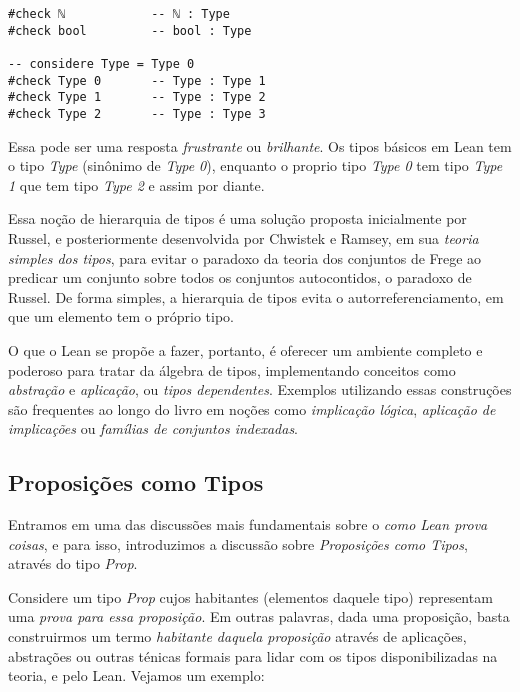 \vspace{5mm}
\begin{lstlisting}
#check ℕ            -- ℕ : Type
#check bool         -- bool : Type

-- considere Type = Type 0
#check Type 0       -- Type : Type 1
#check Type 1       -- Type : Type 2
#check Type 2       -- Type : Type 3
\end{lstlisting}
\vspace{5mm}

\noindent Essa pode ser uma resposta \textit{frustrante} ou \textit{brilhante}.
Os tipos básicos em Lean tem o tipo \textit{Type} (sinônimo de \textit{Type 0}), enquanto o proprio tipo \textit{Type 0} tem tipo \textit{Type 1} que tem tipo \textit{Type 2} e assim por diante.

Essa noção de hierarquia de tipos é uma solução proposta inicialmente por Russel, e posteriormente desenvolvida por Chwistek e Ramsey, em sua \textit{teoria simples dos tipos}, para evitar o paradoxo da teoria dos conjuntos de Frege ao predicar um conjunto sobre todos os conjuntos autocontidos, o paradoxo de Russel.
De forma simples, a hierarquia de tipos evita o autorreferenciamento, em que um elemento tem o próprio tipo.

O que o Lean se propõe a fazer, portanto, é oferecer um ambiente completo e poderoso para tratar da álgebra de tipos, implementando conceitos como \textit{abstração} e \textit{aplicação}, ou \textit{tipos dependentes}.
Exemplos utilizando essas construções são frequentes ao longo do livro em noções como \textit{implicação lógica}, \textit{aplicação de implicações} ou \textit{famílias de conjuntos indexadas}.

\subsection{Proposições como Tipos}
Entramos em uma das discussões mais fundamentais sobre o \textit{como Lean prova coisas}, e para isso, introduzimos a discussão sobre \textit{Proposições como Tipos}, através do tipo \textit{Prop}.

Considere um tipo \textit{Prop} cujos habitantes (elementos daquele tipo) representam uma \textit{prova para essa proposição}.
Em outras palavras, dada uma proposição, basta construirmos um termo \textit{habitante daquela proposição} através de aplicações, abstrações ou outras ténicas formais para lidar com os tipos disponibilizadas na teoria, e pelo Lean.
Vejamos um exemplo:

